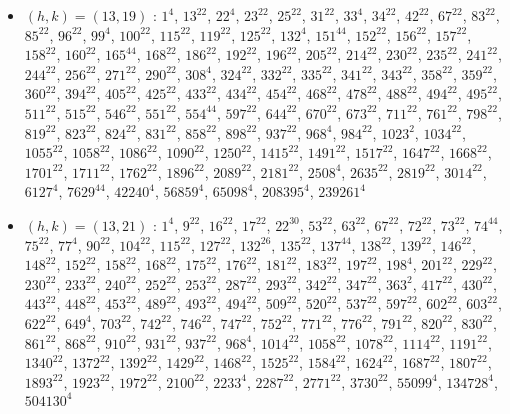 \begin{itemize}
\item $(h,k)=(13,19)$ : $1^{4}$, $13^{22}$, $22^{4}$, $23^{22}$, $25^{22}$, $31^{22}$, $33^{4}$, $34^{22}$, $42^{22}$, $67^{22}$, $83^{22}$, $85^{22}$, $96^{22}$, $99^{4}$, $100^{22}$, $115^{22}$, $119^{22}$, $125^{22}$, $132^{4}$, $151^{44}$, $152^{22}$, $156^{22}$, $157^{22}$, $158^{22}$, $160^{22}$, $165^{44}$, $168^{22}$, $186^{22}$, $192^{22}$, $196^{22}$, $205^{22}$, $214^{22}$, $230^{22}$, $235^{22}$, $241^{22}$, $244^{22}$, $256^{22}$, $271^{22}$, $290^{22}$, $308^{4}$, $324^{22}$, $332^{22}$, $335^{22}$, $341^{22}$, $343^{22}$, $358^{22}$, $359^{22}$, $360^{22}$, $394^{22}$, $405^{22}$, $425^{22}$, $433^{22}$, $434^{22}$, $454^{22}$, $468^{22}$, $478^{22}$, $488^{22}$, $494^{22}$, $495^{22}$, $511^{22}$, $515^{22}$, $546^{22}$, $551^{22}$, $554^{44}$, $597^{22}$, $644^{22}$, $670^{22}$, $673^{22}$, $711^{22}$, $761^{22}$, $798^{22}$, $819^{22}$, $823^{22}$, $824^{22}$, $831^{22}$, $858^{22}$, $898^{22}$, $937^{22}$, $968^{4}$, $984^{22}$, $1023^{2}$, $1034^{22}$, $1055^{22}$, $1058^{22}$, $1086^{22}$, $1090^{22}$, $1250^{22}$, $1415^{22}$, $1491^{22}$, $1517^{22}$, $1647^{22}$, $1668^{22}$, $1701^{22}$, $1711^{22}$, $1762^{22}$, $1896^{22}$, $2089^{22}$, $2181^{22}$, $2508^{4}$, $2635^{22}$, $2819^{22}$, $3014^{22}$, $6127^{4}$, $7629^{44}$, $42240^{4}$, $56859^{4}$, $65098^{4}$, $208395^{4}$, $239261^{4}$
\item $(h,k)=(13,21)$ : $1^{4}$, $9^{22}$, $16^{22}$, $17^{22}$, $22^{30}$, $53^{22}$, $63^{22}$, $67^{22}$, $72^{22}$, $73^{22}$, $74^{44}$, $75^{22}$, $77^{4}$, $90^{22}$, $104^{22}$, $115^{22}$, $127^{22}$, $132^{26}$, $135^{22}$, $137^{44}$, $138^{22}$, $139^{22}$, $146^{22}$, $148^{22}$, $152^{22}$, $158^{22}$, $168^{22}$, $175^{22}$, $176^{22}$, $181^{22}$, $183^{22}$, $197^{22}$, $198^{4}$, $201^{22}$, $229^{22}$, $230^{22}$, $233^{22}$, $240^{22}$, $252^{22}$, $253^{22}$, $287^{22}$, $293^{22}$, $342^{22}$, $347^{22}$, $363^{2}$, $417^{22}$, $430^{22}$, $443^{22}$, $448^{22}$, $453^{22}$, $489^{22}$, $493^{22}$, $494^{22}$, $509^{22}$, $520^{22}$, $537^{22}$, $597^{22}$, $602^{22}$, $603^{22}$, $622^{22}$, $649^{4}$, $703^{22}$, $742^{22}$, $746^{22}$, $747^{22}$, $752^{22}$, $771^{22}$, $776^{22}$, $791^{22}$, $820^{22}$, $830^{22}$, $861^{22}$, $868^{22}$, $910^{22}$, $931^{22}$, $937^{22}$, $968^{4}$, $1014^{22}$, $1058^{22}$, $1078^{22}$, $1114^{22}$, $1191^{22}$, $1340^{22}$, $1372^{22}$, $1392^{22}$, $1429^{22}$, $1468^{22}$, $1525^{22}$, $1584^{22}$, $1624^{22}$, $1687^{22}$, $1807^{22}$, $1893^{22}$, $1923^{22}$, $1972^{22}$, $2100^{22}$, $2233^{4}$, $2287^{22}$, $2771^{22}$, $3730^{22}$, $55099^{4}$, $134728^{4}$, $504130^{4}$

\end{itemize}
